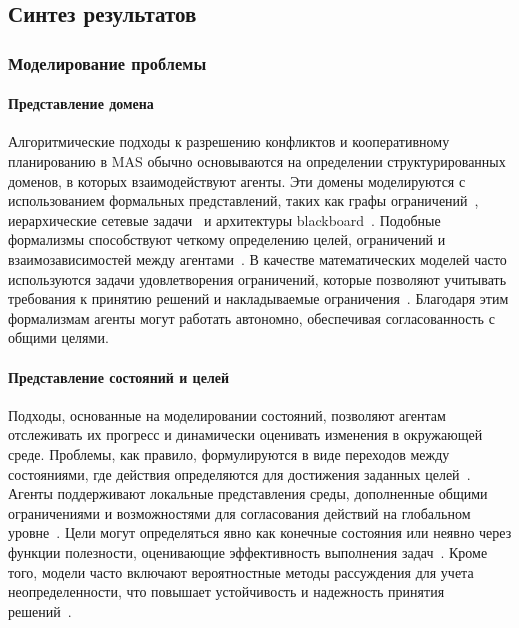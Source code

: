 \subsection{Синтез результатов}

\subsubsection{Моделирование проблемы}

\paragraph{Представление домена}

Алгоритмические подходы к разрешению конфликтов и кооперативному планированию в MAS
обычно основываются на определении структурированных доменов, в которых взаимодействуют агенты.
Эти домены моделируются с использованием формальных представлений,
таких как графы ограничений~\cite{SHARON201540,SEMIZ2021220},
иерархические сетевые задачи~\cite{FRANKOVIC20017} и архитектуры blackboard~\cite{DURFEE1988268}.
Подобные формализмы способствуют четкому определению целей,
ограничений и взаимозависимостей между агентами~\cite{GROSZ1996269}.
В качестве математических моделей часто используются задачи удовлетворения ограничений,
которые позволяют учитывать требования к принятию решений и накладываемые ограничения~\cite{KOMENDA201476}.
Благодаря этим формализмам агенты могут работать автономно, обеспечивая согласованность с общими целями.

\paragraph{Представление состояний и целей}

Подходы, основанные на моделировании состояний, позволяют агентам отслеживать их прогресс и динамически оценивать изменения в окружающей среде.
Проблемы, как правило, формулируются в виде переходов между состояниями,
где действия определяются для достижения заданных целей~\cite{CHOUHAN2015396}.
Агенты поддерживают локальные представления среды,
дополненные общими ограничениями и возможностями для согласования действий на глобальном уровне~\cite{ROSENSCHEIN1988187}.
Цели могут определяться явно как конечные состояния или неявно через функции полезности,
оценивающие эффективность выполнения задач~\cite{MA2021103823}.
Кроме того, модели часто включают вероятностные методы рассуждения для учета неопределенности,
что повышает устойчивость и надежность принятия решений~\cite{WU2011487}.

